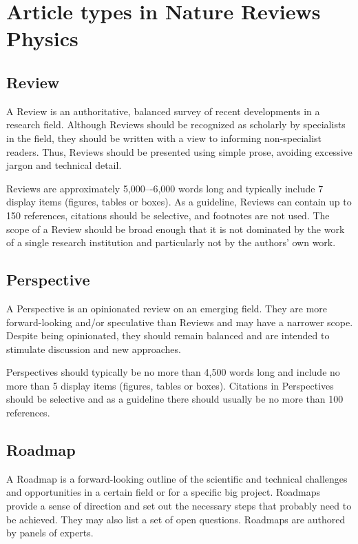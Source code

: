 \documentclass[fleqn,10pt]{wlscirep}
\begin{document}
\section*{Article types in Nature Reviews Physics}
\subsection*{Review}
A Review\cite{Review} is an authoritative, balanced survey of recent developments in a research field. Although Reviews should be recognized as scholarly by specialists in the field, they should be written with a view to informing non-specialist readers. Thus, Reviews should be presented using simple prose, avoiding excessive jargon and technical detail.

Reviews are approximately 5,000–-6,000 words long and typically include 7 display items (figures, tables or boxes). As a guideline, Reviews can contain up to 150 references, citations should be selective, and footnotes are not used. The scope of a Review should be broad enough that it is not dominated by the work of a single research institution and particularly not by the authors' own work.
\subsection*{Perspective}

A Perspective\cite{Perspective} is an opinionated review on an emerging field. They are more forward-looking and/or speculative than Reviews and may have a narrower scope. Despite being opinionated, they should remain balanced and are intended to stimulate discussion and new approaches.

Perspectives should typically be no more than 4,500 words long and include no more than 5 display items (figures, tables or boxes). Citations in Perspectives should be selective and as a guideline there should usually be no more than 100 references. 

\subsection*{Roadmap}

A Roadmap is a forward-looking outline of the scientific and technical challenges and opportunities in a certain field or for a specific big project. Roadmaps provide a sense of direction and set out the necessary steps that probably need to be achieved. They may also list a set of open questions. Roadmaps are authored by panels of experts.
\end{document}
